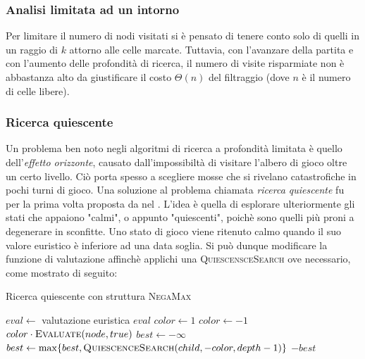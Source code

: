 \documentclass{article}
\begin{document}

\subsubsection{Analisi limitata ad un intorno}

Per limitare il numero di nodi visitati si \`e pensato di tenere conto solo di
quelli in un raggio di $k$ attorno alle celle marcate. Tuttavia, con l'avanzare
della partita e con l'aumento delle profondit\`a di ricerca, il numero di visite
risparmiate non \`e abbastanza alto da giustificare il costo $\Theta(n)$ del
filtraggio (dove $n$ \`e il numero di celle libere).

\subsubsection{Ricerca quiescente}

Un problema ben noto negli algoritmi di ricerca a profondit\`a limitata \`e
quello dell'\emph{effetto orizzonte}, causato dall'impossibilt\`a 
di visitare l'albero di gioco oltre un certo livello. Ci\`o porta spesso a scegliere 
mosse che si rivelano catastrofiche in pochi turni di gioco. 
Una soluzione al problema chiamata \emph{ricerca quiescente} \cite{quiescence} fu per la prima
volta proposta  da \citeauthor{quiescence} nel \citeyear{quiescence}.
L'idea \`e quella di esplorare ulteriormente gli stati che appaiono "calmi", o
appunto "quiescenti", poich\`e sono quelli pi\`u proni a degenerare in sconfitte.
Uno stato di gioco viene ritenuto calmo quando il suo valore euristico \`e inferiore
ad una data soglia. Si pu\`o dunque modificare la funzione di valutazione affinch\`e
applichi una \textsc{QuiescensceSearch} ove necessario, come mostrato di seguito:

\begin{algorithm}[H]
  \caption{Ricerca quiescente con struttura \textsc{NegaMax}}
  \label{qs}
  \begin{algorithmic}[0]
      \State $eval \gets $ valutazione euristica
        \State \Return $eval$
      \Else
        \State $color \gets 1$
          \State $color \gets -1$
        \EndIf
        \State \Return {}
      \EndIf
    \EndProcedure
    \Statex
      \State \Return $color \cdot \Call{Evaluate}{node, true}$
    \EndIf
    \State $best \gets -\infty$
      \State $best \gets \max\{best, \Call{QuiescenceSearch}{child, -color, depth-1}\}$
    \EndFor
    \State \Return $-best$
    \EndProcedure
  \end{algorithmic}
\end{algorithm}
\end{document}
